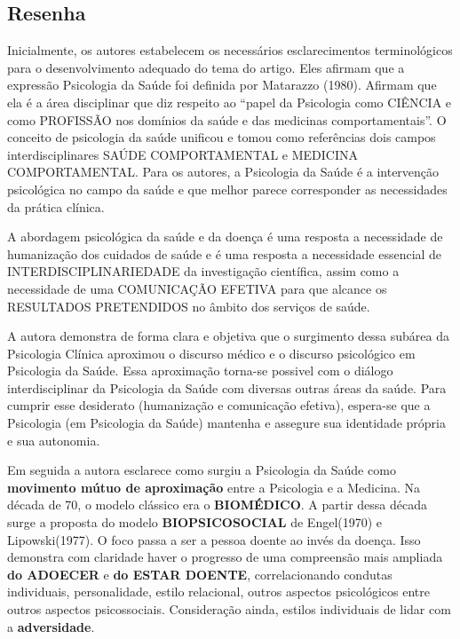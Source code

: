 \documentclass[
]{book}
\begin{document}
\hypertarget{resenha}{%
\subsection{Resenha}\label{resenha}}

Inicialmente, os autores estabelecem os necessários esclarecimentos terminológicos para o desenvolvimento adequado do tema do artigo. Eles afirmam que a expressão Psicologia da Saúde foi definida por Matarazzo (1980). Afirmam que ela é a área disciplinar que diz respeito ao ``papel da Psicologia como CIÊNCIA e como PROFISSÃO nos domínios da saúde e das medicinas comportamentais''. O conceito de psicologia da saúde unificou e tomou como referências dois campos interdisciplinares SAÚDE COMPORTAMENTAL e MEDICINA COMPORTAMENTAL. Para os autores, a Psicologia da Saúde é a intervenção psicológica no campo da saúde e que melhor parece corresponder as necessidades da prática clínica.

A abordagem psicológica da saúde e da doença é uma resposta a necessidade de humanização dos cuidados de saúde e é uma resposta a necessidade essencial de INTERDISCIPLINARIEDADE da investigação científica, assim como a necessidade de uma COMUNICAÇÃO EFETIVA para que alcance os RESULTADOS PRETENDIDOS no âmbito dos serviços de saúde.

A autora demonstra de forma clara e objetiva que o surgimento dessa subárea da Psicologia Clínica aproximou o discurso médico e o discurso psicológico em Psicologia da Saúde. Essa aproximação torna-se possivel com o diálogo interdisciplinar da Psicologia da Saúde com diversas outras áreas da saúde. Para cumprir esse desiderato (humanização e comunicação efetiva), espera-se que a Psicologia (em Psicologia da Saúde) mantenha e assegure sua identidade própria e sua autonomia.

Em seguida a autora esclarece como surgiu a Psicologia da Saúde como \textbf{movimento mútuo de aproximação} entre a Psicologia e a Medicina. Na década de 70, o modelo clássico era o \textbf{BIOMÉDICO}. A partir dessa década surge a proposta do modelo \textbf{BIOPSICOSOCIAL} de Engel(1970) e Lipowski(1977). O foco passa a ser a pessoa doente ao invés da doença. Isso demonstra com claridade haver o progresso de uma compreensão mais ampliada \textbf{do ADOECER} e \textbf{do ESTAR DOENTE}, correlacionando condutas individuais, personalidade, estilo relacional, outros aspectos psicológicos entre outros aspectos psicossociais. Consideração ainda, estilos individuais de lidar com a \textbf{adversidade}.
\end{document}
